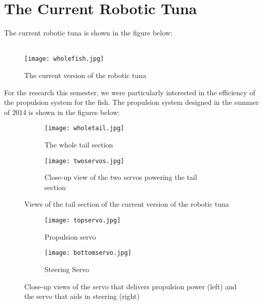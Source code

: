 \section{The Current Robotic Tuna}

The current robotic tuna is shown in the figure below: \\ \\

\begin{figure}[h!]
\centering
\texttt{[image: wholefish.jpg]}
\caption{The current version of the robotic tuna}
\label{fig:wholefish}
\end{figure} 

\noindent For the research this semester, we were particularly interested in the efficiency of the propulsion system for the fish. The propulsion system designed in the summer of 2014 is shown in the figures below:

\begin{figure}[h!]
\centering
\begin{subfigure}{.5\textwidth}
  \centering
  \texttt{[image: wholetail.jpg]}
  \caption{The whole tail section}
  \label{fig:wholetail}
\end{subfigure}%
\begin{subfigure}{.5\textwidth}
  \centering
  \texttt{[image: twoservos.jpg]}
  \caption{Close-up view of the two servos powering the tail section}
  \label{fig: twoservos}
\end{subfigure}
\caption{Views of the tail section of the current version of the robotic tuna}
\label{fig:tailviews}
\end{figure}

\begin{figure}[h!]
\centering
\begin{subfigure}{.5\textwidth}
  \centering
  \texttt{[image: topservo.jpg]}
  \caption{Propulsion servo}
  \label{fig:topservo}
\end{subfigure}%
\begin{subfigure}{.5\textwidth}
  \centering
  \texttt{[image: bottomservo.jpg]}
  \caption{Steering Servo}
  \label{fig: bottomservo}
\end{subfigure}
\caption{Close-up views of the servo that delivers propulsion power (left) and the servo that aids in steering (right)}
\label{fig:servoviews}
\end{figure}

